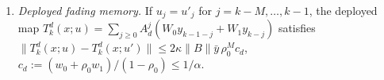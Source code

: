 \begin{lemma}[Lemma D]
\begin{enumerate}[label=(\alph*)]
the PDE residual and $q_k$ the interpolation/quadrature defect with $\|A_d^mq_k\|\le\kappa\rho_0^m\bar q$, and the
step is fed samples with $\|v_k\|\le\delta_y$, then
\[
\|\hat z_k-\zeta_k\|\le\kappa\rho^k\|\hat z_0-\zeta_0\|+\frac{\kappa\big(\|B\|(1+\ell_\Phi\tfrac{dt}2)\delta_y+\varepsilon_{\rm res}\big)}{\alpha-\kappa\ell_\Phi\beta}+\frac{\kappa\,\alpha\,\bar q}{(1-\rho_0)(\alpha-\kappa\ell_\Phi\beta)},
\]
a single factor $\kappa$, with $\bar q=O(dt^3)$ so the last term is $O(dt^2)$.
\item \emph{Deployed fading memory.} If $u_j=u'_j$ for $j=k-M,\dots,k-1$, the deployed map
$T^d_k(x;u)=\sum_{j\ge0}A_d^j(W_0y_{k-1-j}+W_1y_{k-j})$ satisfies
$\|T^d_k(x;u)-T^d_k(x;u')\|\le2\kappa\|B\|\bar y\,\rho_0^Mc_d$, $c_d:=(w_0+\rho_0w_1)/(1-\rho_0)\le1/\alpha$.
\end{enumerate}
\end{lemma}

